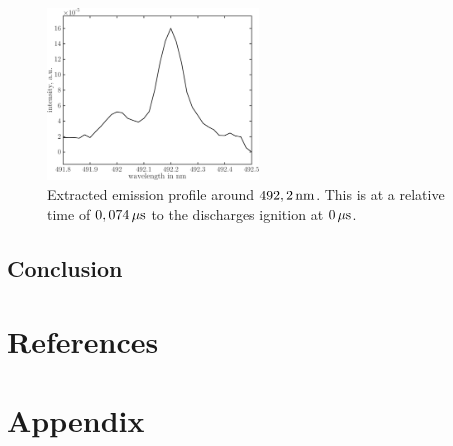 \documentclass[a4paper,10pt]{article}
\begin{document}
				\begin{figure}
					\centering
					\includegraphics[width=0.5\textwidth]{figures/stark/stark_shift71in.pdf}
					\caption{Extracted emission profile around $\unit[492,2]{nm}$. This is at a relative time of $\unit[0,074]{\mu s}$ to the discharges ignition at $\unit[0]{\mu s}$.}
					\label{img:starkshift71}
				\end{figure}

		\subsection{Conclusion}
		
	\section{References}

		
		

	\section{Appendix}
\end{document}
